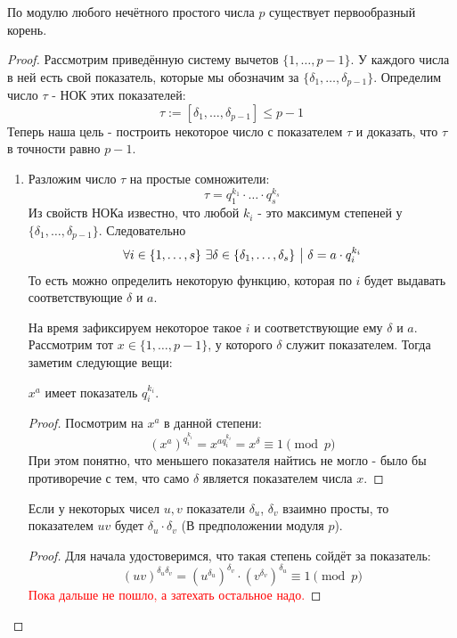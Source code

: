 \begin{theorem}
	По модулю любого нечётного простого числа $p$ существует первообразный корень.
\end{theorem}

\begin{proof}
	Рассмотрим приведённую систему вычетов $\{1, \ldots, p - 1\}$. У каждого числа в ней есть свой показатель, которые мы обозначим за $\{\delta_1, \ldots, \delta_{p - 1}\}$. Определим число $\tau$ - НОК этих показателей:
	\[
		\tau := [\delta_1, \ldots, \delta_{p - 1}] \le p - 1
	\]
	Теперь наша цель - построить некоторое число с показателем $\tau$ и доказать, что $\tau$ в точности равно $p - 1$.
	\begin{enumerate}
		\item Разложим число $\tau$ на простые сомножители:
		\[
			\tau = q_1^{k_1} \cdot \ldots \cdot q_s^{k_s}
		\]
		Из свойств НОКа известно, что любой $k_i$ - это максимум степеней у $\{\delta_1, \ldots, \delta_{p - 1}\}$. Следовательно
		\[
			\forall i \in \{1, \ldots, s\}\ \exists \delta \in \{\delta_1, \ldots, \delta_s\} \ \big|\  \delta = a \cdot q_i^{k_i}
		\]
		То есть можно определить некоторую функцию, которая по $i$ будет выдавать соответствующие $\delta$ и $a$.
		
		На время зафиксируем некоторое такое $i$ и соответствующие ему $\delta$ и $a$. Рассмотрим тот $x \in \{1,\ldots, p - 1\}$, у которого $\delta$ служит показателем. Тогда заметим следующие вещи:
		\begin{proposition}
			$x^a$ имеет показатель $q_i^{k_i}$.
		\end{proposition}
		
		\begin{proof}
			Посмотрим на $x^a$ в данной степени:
			\[
				(x^a)^{q_i^{k_i}} = x^{aq_i^{k_i}} = x^\delta \equiv 1 \pmod p
			\]
			При этом понятно, что меньшего показателя найтись не могло - было бы противоречие с тем, что само $\delta$ является показателем числа $x$.
		\end{proof}
	
		\begin{proposition}
			Если у некоторых чисел $u, v$ показатели $\delta_u$, $\delta_v$ взаимно просты, то показателем $uv$ будет $\delta_u \cdot \delta_v$ (В предположении модуля $p$).
		\end{proposition}
	
		\begin{proof}
			Для начала удостоверимся, что такая степень сойдёт за показатель:
			\[
				(uv)^{\delta_u\delta_v} = (u^{\delta_u})^{\delta_v} \cdot (v^{\delta_v})^{\delta_u} \equiv 1 \pmod p
			\]
			\textcolor{red}{Пока дальше не пошло, а затехать остальное надо.}
		\end{proof}
	

\end{enumerate}
\end{proof}
